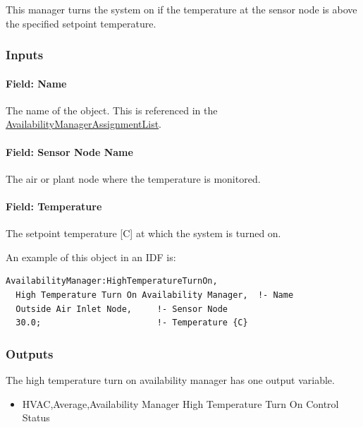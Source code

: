 This manager turns the system on if the temperature at the sensor node is above the specified setpoint temperature.

\subsubsection{Inputs}\label{inputs-6-028}

\paragraph{Field: Name}\label{field-name-5-025}

The name of the object. This is referenced in the \hyperref[availabilitymanagerassignmentlist]{AvailabilityManagerAssignmentList}.

\paragraph{Field: Sensor Node Name}\label{field-sensor-node-name-1-000}

The air or plant node where the temperature is monitored.

\paragraph{Field: Temperature}\label{field-temperature-1}

The setpoint temperature {[}C{]} at which the system is turned on.

An example of this object in an IDF is:

\begin{lstlisting}
AvailabilityManager:HighTemperatureTurnOn,
  High Temperature Turn On Availability Manager,  !- Name
  Outside Air Inlet Node,     !- Sensor Node
  30.0;                       !- Temperature {C}
\end{lstlisting}

\subsubsection{Outputs}\label{outputs-5-010}

The high temperature turn on availability manager has one output variable.

\begin{itemize}
\tightlist
\item
  HVAC,Average,Availability Manager High Temperature Turn On Control Status
\end{itemize}

